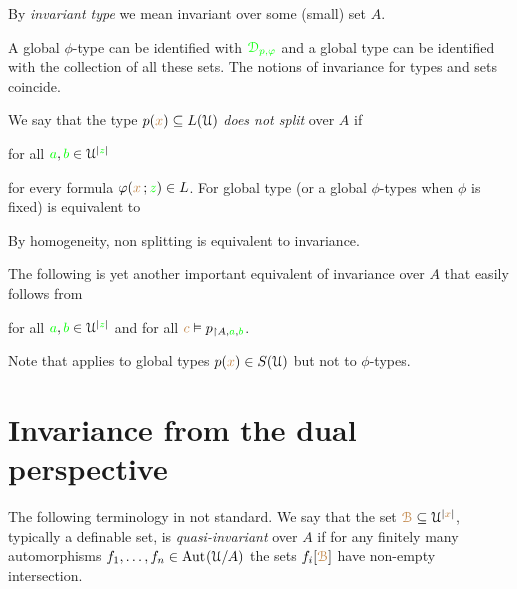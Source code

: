\documentclass[creche.tex]{subfiles}
\begin{document}
By \emph{invariant type\/} we mean invariant over some (small) set $A$.

A global $\phi$-type can be identified with ${\color{green}\EuScript D_{p,\varphi}}$ and a global type can be identified with the collection of all these sets. The notions of invariance for types and sets coincide.


We say that the type $p({\color{brown} x})\subseteq L(\EuScript U)$ \emph{does not split\/} over $A$ if

\hfill for all ${\color{green} a},{\color{green} b}\in\EuScript U^{|{\color{green} z}|}$

for every formula $\varphi({\color{brown} x}\,;{\color{green} z})\in L$. For global type (or a global $\phi$-types  when $\phi$ is fixed)  is equivalent to


By homogeneity, non splitting is equivalent to invariance. 

The following is yet another important equivalent of invariance over $A$ that easily follows from 

\hfill for all ${\color{green} a},{\color{green} b}\in\EuScript U^{|{\color{green} z}|}$ and for all ${\color{brown} c}\vDash p_{\restriction A,{\color{green} a},{\color{green} b}}$. 

Note that  applies to global types $p({\color{brown} x})\in S(\EuScript U)$ but not to $\phi$-types.

\section{Invariance from the dual perspective}

\noindent\llap{\textcolor{red}{\Large\danger}\kern1.5ex}The following terminology in not standard. We say that the set ${\color{brown}\EuScript B}\subseteq\EuScript U^{|{\color{brown} x}|}$, typically a definable set, is \emph{quasi-invariant\/} over $A$ if for any finitely many automorphisms $f_1,\dots,f_n\in\textrm{Aut\kern.15ex}(\EuScript U/A)$ the sets $f_i[{\color{brown}\EuScript B}]$ have non-empty intersection.
\end{document}
